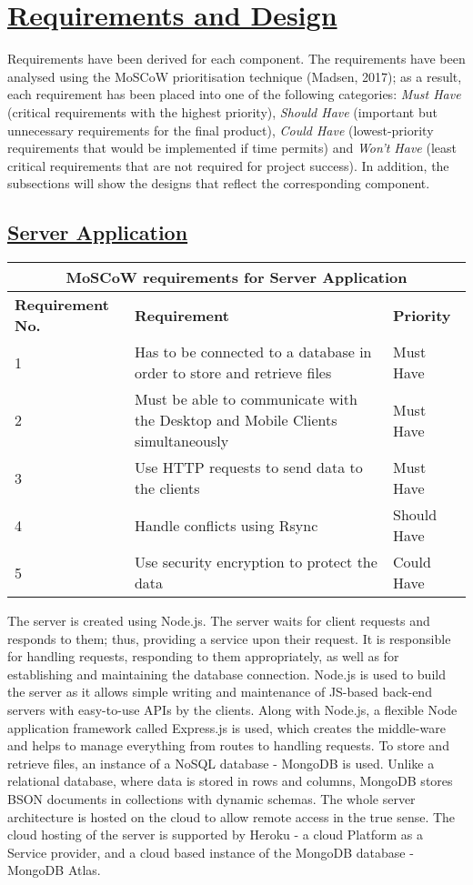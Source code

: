 \documentclass{article}
\begin{document}
\section{\underline{Requirements and Design}}
Requirements have been derived for each component. The requirements have been analysed using the MoSCoW prioritisation technique (Madsen, 2017); as a result, each requirement has been placed into one of the following categories: \textit{Must Have} (critical requirements with the highest priority), \textit{Should Have} (important but unnecessary requirements for the final product), \textit{Could Have} (lowest-priority requirements that would be implemented if time permits) and \textit{Won't Have} (least critical requirements that are not required for project success). In addition, the subsections will show the designs that reflect the corresponding component.

\subsection{\underline{Server Application}}

\begin{tabular}{|p{3cm}|p{5cm}|p{4cm}|}
\hline
\multicolumn{3}{|c|}{\textbf{MoSCoW requirements for Server Application}} \\
\hline
\textbf{Requirement No.} & \textbf{Requirement} & \textbf{Priority}\\
\hline
1 & Has to be connected to a database in order to store and retrieve files & Must Have \\
\hline
2 & Must be able to communicate with the Desktop and Mobile Clients simultaneously & Must Have \\
\hline
3 & Use HTTP requests to send data to the clients & Must Have \\
\hline
4 & Handle conflicts using Rsync & Should Have \\
\hline
5 & Use security encryption to protect the data & Could Have\\
\hline
\end{tabular}

The server is created using Node.js. The server waits for client requests and responds to them; thus, providing a service upon their request. It is responsible for handling requests, responding to them appropriately, as well as for establishing and maintaining the database connection. Node.js is used to build the server as it allows simple writing and maintenance of JS-based back-end servers with easy-to-use APIs by the clients. Along with Node.js, a flexible Node application framework called Express.js is used, which creates the middle-ware and helps to manage everything from routes to handling requests. To store and retrieve files, an instance of a NoSQL database - MongoDB is used. Unlike a relational database, where data is stored in rows and columns, MongoDB stores BSON documents in collections with dynamic schemas. The whole server architecture is hosted on the cloud to allow remote access in the true sense. The cloud hosting of the server is supported by Heroku - a cloud Platform as a Service provider, and a cloud based instance of the MongoDB database - MongoDB Atlas.
\end{document}
